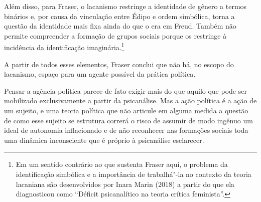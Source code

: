 Além disso, para Fraser, o lacanismo restringe a identidade de gênero a
termos binários e, por causa da vinculação entre Édipo e ordem
simbólica, torna a questão da identidade mais fixa ainda do que o era em
Freud. Também não permite compreender a formação de grupos sociais
porque os restringe à incidência da identificação imaginária.\footnote{Em
  um sentido contrário ao que sustenta Fraser aqui, o problema da
  identificação simbólica e a importância de trabalhá"-la no contexto da
  teoria lacaniana são desenvolvidos por Inara Marin (2018) a partir do
  que ela diagnosticou como ``Déficit psicanalítico na teoria crítica
  feminista''.}

A partir de todos esses elementos, Fraser conclui que não há, no escopo
do lacanismo, espaço para um agente possível da prática política.

Pensar a agência política parece de fato exigir mais do que aquilo que
pode ser mobilizado exclusivamente a partir da psicanálise. Mas a ação
política é a ação de um sujeito, e uma teoria política que não articule
em alguma medida a questão de como esse sujeito se estrutura correrá o
risco de assumir de modo ingênuo um ideal de autonomia inflacionado e de
não reconhecer nas formações sociais toda uma dinâmica inconsciente que
é próprio à psicanálise esclarecer.

